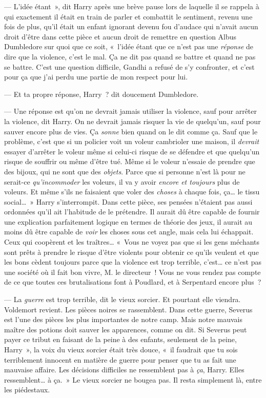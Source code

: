 --- L'idée étant~», dit Harry après une brève pause lors de laquelle il se rappela à qui exactement il était en train de parler et combattit le sentiment, revenu une fois de plus, qu'il était un enfant ignorant devenu fou d'audace qui n'avait aucun droit d'être dans cette pièce et aucun droit de remettre en question Albus Dumbledore sur quoi que ce soit, «~l'idée étant que ce n'est pas une \emph{réponse} de dire que la violence, c'est le mal. Ça ne dit pas quand se battre et quand ne pas se battre. C'est une question difficile, Gandhi a refusé de s'y confronter, et c'est pour ça que j'ai perdu une partie de mon respect pour lui.

--- Et ta propre réponse, Harry~? dit doucement Dumbledore.

--- Une réponse est qu'on ne devrait jamais utiliser la violence, sauf pour arrêter la violence, dit Harry. On ne devrait jamais risquer la vie de quelqu'un, sauf pour sauver encore plus de vies. Ça \emph{sonne} bien quand on le dit comme ça. Sauf que le problème, c'est que si un policier voit un voleur cambrioler une maison, il \emph{devrait} essayer d'arrêter le voleur même si celui-ci risque de se défendre et que quelqu'un risque de souffrir ou même d'être tué. Même si le voleur n'essaie de prendre que des bijoux, qui ne sont que des \emph{objets}. Parce que si personne n'est là pour ne serait-ce \emph{qu'incommoder} les voleurs, il va y avoir \emph{encore et toujours} plus de voleurs. Et même s'ils ne faisaient que voler des \emph{choses} à chaque fois, ça… le tissu social…~» Harry s'interrompit. Dans cette pièce, ses pensées n'étaient pas aussi ordonnées qu'il ait l'habitude de le prétendre. Il aurait dû être capable de fournir une explication parfaitement logique en termes de théorie des jeux, il aurait au moins dû être capable de \emph{voir} les choses sous cet angle, mais cela lui échappait. Ceux qui coopèrent et les traîtres… «~Vous ne voyez pas que si les gens méchants sont prêts à prendre le risque d'être violents pour obtenir ce qu'ils veulent et que les bons cèdent toujours parce que la violence est trop terrible, c'est… ce n'est pas une société où il fait bon vivre, M. le directeur~! Vous ne vous rendez pas compte de ce que toutes ces brutalisations font à Poudlard, et à Serpentard encore plus~?

--- La \emph{guerre} est trop terrible, dit le vieux sorcier. Et pourtant elle viendra. Voldemort revient. Les pièces noires se rassemblent. Dans cette guerre, Severus est l'une des pièces les plus importantes de notre camp. Mais notre mauvais maître des potions doit sauver les apparences, comme on dit. Si Severus peut payer ce tribut en faisant de la peine à des enfants, seulement de la peine, Harry~», la voix du vieux sorcier était très douce, «~il faudrait que tu sois terriblement innocent en matière de guerre pour penser que tu as fait une mauvaise affaire. Les décisions difficiles ne ressemblent pas à \emph{ça}, Harry. Elles ressemblent… à ça.~» Le vieux sorcier ne bougea pas. Il resta simplement là, entre les piédestaux.

